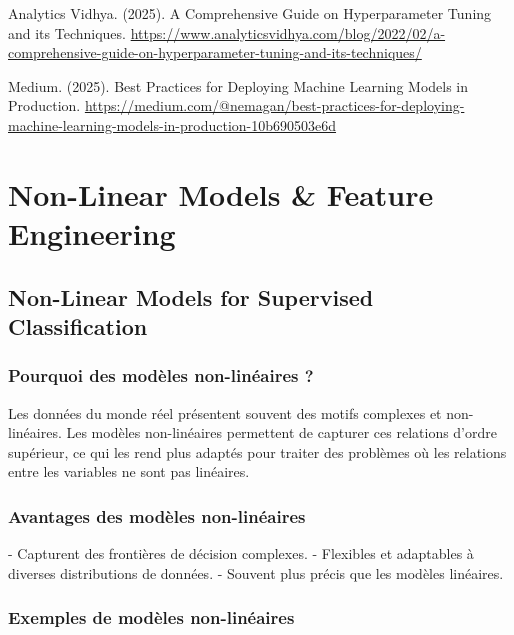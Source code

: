 \documentclass[10pt,a4paper]{article}
\begin{document}

\begin{thebibliography}{9}
Analytics Vidhya. (2025). A Comprehensive Guide on Hyperparameter Tuning and its Techniques.
\url{https://www.analyticsvidhya.com/blog/2022/02/a-comprehensive-guide-on-hyperparameter-tuning-and-its-techniques/}

Medium. (2025). Best Practices for Deploying Machine Learning Models in Production.
\url{https://medium.com/@nemagan/best-practices-for-deploying-machine-learning-models-in-production-10b690503e6d}
\end{thebibliography}

\section*{Non-Linear Models \& Feature Engineering}

\subsection*{Non-Linear Models for Supervised Classification}

\subsubsection*{Pourquoi des modèles non-linéaires ?}

Les données du monde réel présentent souvent des motifs complexes et non-linéaires. Les modèles non-linéaires permettent de capturer ces relations d'ordre supérieur, ce qui les rend plus adaptés pour traiter des problèmes où les relations entre les variables ne sont pas linéaires.

\subsubsection*{Avantages des modèles non-linéaires}

- Capturent des frontières de décision complexes.
- Flexibles et adaptables à diverses distributions de données.
- Souvent plus précis que les modèles linéaires.

\subsubsection*{Exemples de modèles non-linéaires}
\end{document}
